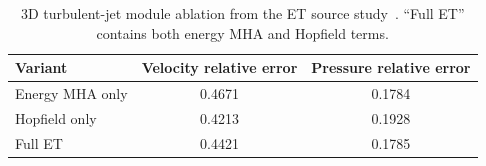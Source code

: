\begin{table}[htbp]
  \centering
  \small
  \begin{tabular}{@{}lcc@{}}
    \toprule
    Variant & Velocity relative error & Pressure relative error \\
    \midrule
    Energy MHA only & 0.4671 & 0.1784 \\
    Hopfield only & 0.4213 & 0.1928 \\
    Full ET & 0.4421 & 0.1785 \\
    \bottomrule
  \end{tabular}
  \caption{3D turbulent-jet module ablation from the ET source study~\cite{zhang2025operator}. “Full ET” contains both energy MHA and Hopfield terms.}
  \label{tab:app-et-module}
\end{table}
